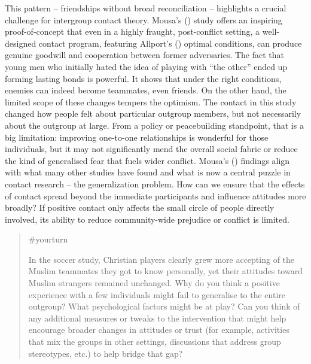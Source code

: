 \documentclass[
  letterpaper,
]{book}
\begin{document}
This pattern -- friendships without broad reconciliation -- highlights a
crucial challenge for intergroup contact theory. Mousa's
() study offers an inspiring
proof-of-concept that even in a highly fraught, post-conflict setting, a
well-designed contact program, featuring Allport's
() optimal conditions, can produce
genuine goodwill and cooperation between former adversaries. The fact
that young men who initially hated the idea of playing with ``the
other'' ended up forming lasting bonds is powerful. It shows that under
the right conditions, enemies can indeed become teammates, even friends.
On the other hand, the limited scope of these changes tempers the
optimism. The contact in this study changed how people felt about
particular outgroup members, but not necessarily about the outgroup at
large. From a policy or peacebuilding standpoint, that is a big
limitation: improving one-to-one relationships is wonderful for those
individuals, but it may not significantly mend the overall social fabric
or reduce the kind of generalised fear that fuels wider conflict.
Mousa's () findings align with
what many other studies have found and what is now a central puzzle in
contact research -- the generalization problem. How can we ensure that
the effects of contact spread beyond the immediate participants and
influence attitudes more broadly? If positive contact only affects the
small circle of people directly involved, its ability to reduce
community-wide prejudice or conflict is limited.

\begin{quote}
{\#yourturn}

In the soccer study, Christian players clearly grew more accepting of
the Muslim teammates they got to know personally, yet their attitudes
toward Muslim strangers remained unchanged. Why do you think a positive
experience with a few individuals might fail to generalise to the entire
outgroup? What psychological factors might be at play? Can you think of
any additional measures or tweaks to the intervention that might help
encourage broader changes in attitudes or trust (for example, activities
that mix the groups in other settings, discussions that address group
stereotypes, etc.) to help bridge that gap?
\end{quote}
\end{document}
